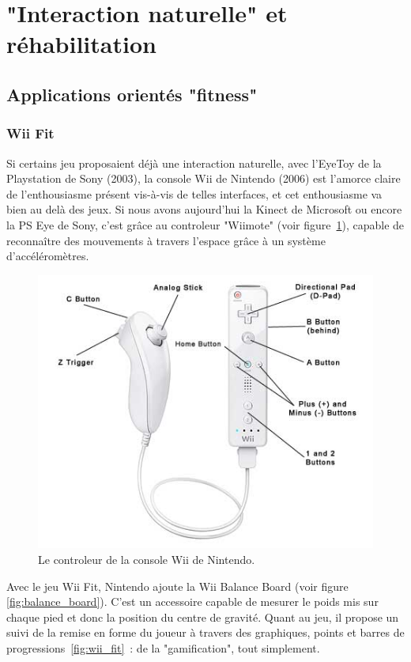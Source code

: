 \section{"Interaction naturelle" et réhabilitation}

\subsection{Applications orientés "fitness"}

\subsubsection{Wii Fit}

Si certains jeu proposaient déjà une interaction naturelle, avec l'EyeToy 
de la Playstation de Sony (2003), la console Wii de Nintendo (2006) est 
l'amorce claire de l'enthousiasme présent vis-à-vis de telles interfaces, et cet enthousiasme va bien
au delà des jeux. 
Si nous avons aujourd'hui la Kinect de Microsoft ou encore la
PS Eye de Sony, c'est grâce au controleur "Wiimote" (voir figure~\ref{fig:wii}), 
capable de reconnaître des mouvements à 
travers l'espace grâce à un système d'accéléromètres. 

\begin{figure}[h!]
\centering
\includegraphics[width=0.7\linewidth]{images/wii_diagram}
\caption{Le controleur de la console Wii de Nintendo.}
\label{fig:wii}
\end{figure}

Avec le jeu Wii Fit, Nintendo ajoute la Wii Balance Board (voir figure 
\ref{fig:balance_board}). C'est un accessoire capable de mesurer le 
poids mis sur chaque pied et donc la position du centre de gravité. Quant au jeu,
il propose un suivi de la remise en forme du joueur à travers des graphiques, 
points et barres de progressions~\ref{fig:wii_fit}~: de la "gamification", 
tout simplement.

